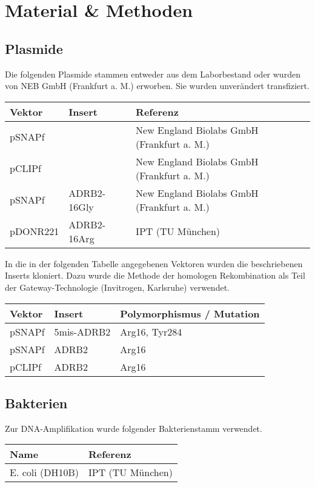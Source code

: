 \chapter{Material \& Methoden}\label{chapter:materialmethoden}

\section{Plasmide}
Die folgenden Plasmide stammen entweder aus dem Laborbestand oder wurden von NEB GmbH (Frankfurt a. M.) erworben. Sie wurden unverändert transfiziert.

\begin{table}[htsb]
    \begin{tabular}{lll}
        \toprule
        Vektor		&	Insert		& 	Referenz	\\
        \midrule
        pSNAPf		&				&	New England Biolabs GmbH (Frankfurt a. M.)\\
        pCLIPf		&				&	New England Biolabs GmbH (Frankfurt a. M.)\\
        pSNAPf		&	ADRB2-16Gly	&	New England Biolabs GmbH (Frankfurt a. M.)\\
        pDONR221	&	ADRB2-16Arg	    &	IPT (TU München)\\
    \bottomrule
    \end{tabular}
\end{table}

In die in der folgenden Tabelle angegebenen Vektoren wurden die beschriebenen Inserts kloniert. Dazu wurde die Methode der homologen Rekombination als Teil der Gateway-Technologie (Invitrogen, Karlsruhe) verwendet.

\begin{table}[htsb]
\begin{tabular}{lll}
\toprule
Vektor		&	Insert		&	Polymorphismus / Mutation\\
\midrule
pSNAPf		&	5mis-ADRB2	&	Arg16, Tyr284\\
pSNAPf		&	ADRB2		&	Arg16\\
pCLIPf		&	ADRB2		&	Arg16\\
\bottomrule
\end{tabular}
\end{table}

\section{Bakterien}
Zur DNA-Amplifikation wurde folgender Bakterienstamm verwendet.
\begin{table}[htsb]
\begin{tabular}{ll}
\toprule
Name		    &	Referenz\\
\midrule
E. coli (DH10B)	&    IPT (TU München)\\
\bottomrule
\end {tabular}
\end{table}


